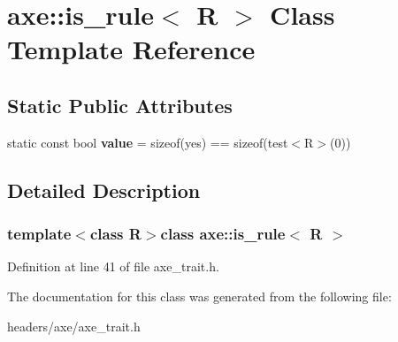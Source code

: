\hypertarget{classaxe_1_1is__rule}{\section{axe\+:\+:is\+\_\+rule$<$ R $>$ Class Template Reference}
\label{classaxe_1_1is__rule}
}
\subsection*{Static Public Attributes}
\begin{DoxyCompactItemize}
\item 
\hypertarget{classaxe_1_1is__rule_aef4d90d4870e8298a5e4589ab1039d44}{static const bool {\bfseries value} = sizeof(yes) == sizeof(test$<$R$>$(0))}\label{classaxe_1_1is__rule_aef4d90d4870e8298a5e4589ab1039d44}

\end{DoxyCompactItemize}


\subsection{Detailed Description}
\subsubsection*{template$<$class R$>$class axe\+::is\+\_\+rule$<$ R $>$}



Definition at line 41 of file axe\+\_\+trait.\+h.



The documentation for this class was generated from the following file\+:\begin{DoxyCompactItemize}
\item 
headers/axe/axe\+\_\+trait.\+h\end{DoxyCompactItemize}
